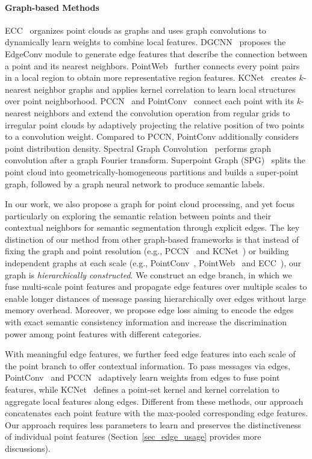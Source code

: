 \documentclass[10pt,twocolumn,letterpaper]{article}
\begin{document}
\vspace{-3mm}
\paragraph{Graph-based Methods}
ECC~\cite{edgefilter} organizes point clouds as graphs and uses graph convolutions to dynamically learn weights to combine local features.
DGCNN~\cite{dgcnn} proposes the EdgeConv module to generate edge features that describe the connection between a point and its nearest neighbors.  
PointWeb~\cite{pointweb} further connects every point pairs in a local region to obtain more representative region features. 
KCNet~\cite{kcnet} creates $k$-nearest neighbor graphs and applies kernel correlation to learn local structures over point neighborhood.   
PCCN~\cite{continuousconv} and PointConv~\cite{pointconv} connect each point with its $k$-nearest neighbors and extend the convolution operation from regular grids to irregular point clouds by adaptively projecting the relative position of two points to a convolution weight. Compared to PCCN, PointConv additionally considers point distribution density.
Spectral Graph Convolution~\cite{spectralconv} performs graph convolution after a graph Fourier transform.
Superpoint Graph (SPG)~\cite{spg} splits the point cloud into geometrically-homogeneous partitions and builds a super-point graph, followed by a graph neural network to produce semantic labels.

In our work, we also propose a graph for point cloud processing, and yet focus particularly on exploring the semantic relation between points and their contextual neighbors for semantic segmentation through explicit edges. 
The key distinction of our method from other graph-based frameworks is that instead of fixing the graph and point resolution (e.g., PCCN~\cite{continuousconv} and KCNet~\cite{kcnet}) or building independent graphs at each scale (e.g., PointConv~\cite{pointconv}, PointWeb~\cite{pointweb} and ECC~\cite{edgefilter}), our graph is \emph{hierarchically constructed}. We construct an edge branch, in which we fuse multi-scale point features and propagate edge features over multiple scales to enable longer distances of message passing hierarchically over edges without large memory overhead.
Moreover, we propose edge loss aiming to encode the edges with exact semantic consistency information and increase the discrimination power among point features with different categories. 

With meaningful edge features, we further feed edge features into each scale of the point branch to offer contextual information. To pass messages via edges, PointConv~\cite{pointconv} and PCCN~\cite{continuousconv} adaptively learn weights from edges to fuse point features, while KCNet~\cite{kcnet} defines a point-set kernel and kernel correlation to aggregate local features along edges. Different from these methods, our approach concatenates each point feature with the max-pooled corresponding edge features. Our approach requires less parameters to learn and preserves the distinctiveness of individual point features (Section~\ref{sec_edge_usage} provides more discussions). 
\end{document}
